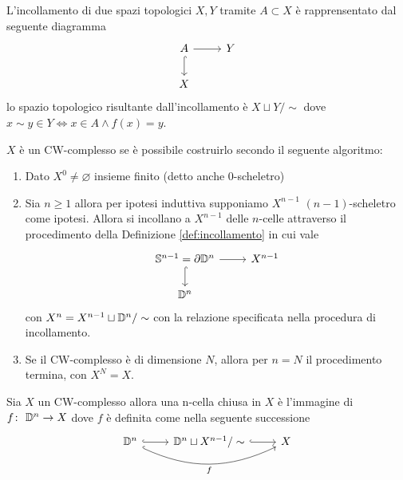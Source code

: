 \begin{definition}
	\label{def:incollamento}
	L'incollamento di due spazi topologici $X,Y$ tramite $A \subset X$ è rapprensentato dal seguente diagramma
	\begin{equation}
	\begin{tikzcd}
	A \arrow[d, hook]{i} \arrow[r]{f} & Y \\
	X
	\end{tikzcd}
	\end{equation} 
	lo spazio topologico risultante dall'incollamento è $X \sqcup Y / \sim$ dove $x \sim y \in Y \Longleftrightarrow x \in A \land f(x) = y$.
\end{definition}

\begin{definition}
	$X$ è un CW-complesso se è possibile costruirlo secondo il seguente algoritmo:
	\begin{enumerate}
		\item Dato $X^0 \neq \varnothing$ insieme finito (detto anche $0$-scheletro)
		\item Sia $n \ge 1$ allora per ipotesi induttiva supponiamo $X^{n-1}$ $(n-1)$-scheletro come ipotesi. Allora si incollano a $X^{n-1}$ delle $n$-celle attraverso il procedimento della Definizione \ref{def:incollamento} in cui vale 
		\begin{equation*}
		\begin{tikzcd}
			\S^{n-1} = \partial \D^n \arrow[d, hook]{i} \arrow[r]{f} & X^{n-1} \\
			\D^n
		\end{tikzcd}
		\end{equation*} 
		con $X^n = X^{n-1} \sqcup \mathbb{D}^n / \sim$ con la relazione specificata nella procedura di incollamento.
		\item Se il CW-complesso è di dimensione $N$, allora per $n = N$ il procedimento termina, con $X^N = X$.  
	\end{enumerate}
\end{definition}

\begin{definition}
	Sia $X$ un CW-complesso allora una n-cella chiusa in $X$ è l'immagine di $f \colon\ \mathbb{D}^n \rightarrow X$ dove $f$ è definita come nella seguente successione
	\begin{equation*}
	\begin{tikzcd}
		\D^n \arrow[bend right=25, swap, hook]{rr}{f} \arrow[r,hook] & \D^n \sqcup X^{n-1} / \sim \arrow[r,hook] & X
	\end{tikzcd}
	\end{equation*}
\end{definition}

